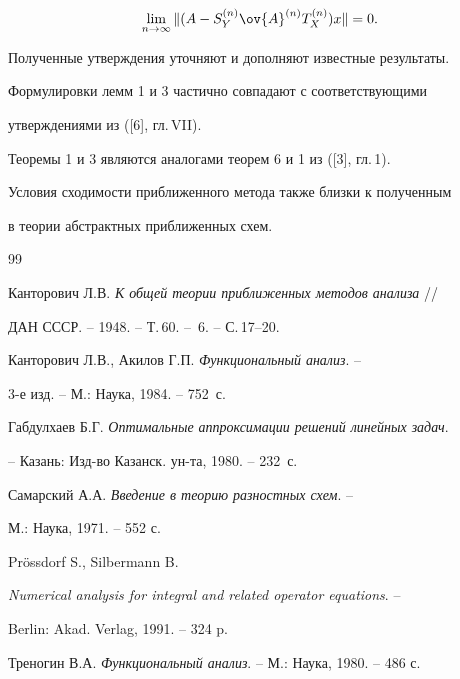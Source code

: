 $$


\lim_{n\to\infty}\nr{(A-S^{(n)}_Y\ov{A}^{(n)} T^{(n)}_X)x} = 0.


$$





Полученные утверждения уточняют и дополняют известные результаты.


Формулировки лемм 1 и 3 частично совпадают с соответствующими


утверждениями из ([6], гл.\,VII). 


Теоремы 1 и 3 являются аналогами теорем 6 и 1 из ([3], гл.\,1).


Условия сходимости приближенного метода также близки к полученным 


в теории абстрактных приближенных схем.








\begin{thebibliography}{99}







Канторович Л.В. {\em К общей теории приближенных методов анализа} //


ДАН СССР. -- 1948. -- Т.\,60. -- \No\,6. -- С.\,17--20.




Канторович Л.В., Акилов Г.П. {\em Функциональный анализ}. -- 


3-е изд. -- М.: Наука, 1984. -- 752~с.




Габдулхаев Б.Г. {\em Оптимальные аппроксимации решений линейных задач}.


-- Казань: Изд-во Казанск. ун-та, 1980. -- 232~с.




Самарский А.А. {\em Введение в теорию разностных схем}. -- 


М.: Наука, 1971. -- 552 с.




Pr\"ossdorf S., Silbermann B.


{\em Numerical analysis for integral and related operator equations}. --


Berlin: Akad. Verlag, 1991. -- 324 p.




Треногин В.А. {\em Функциональный анализ}. -- М.: Наука, 1980. -- 486 с.





\end{thebibliography}





\vskip 2cm












\label{end}





